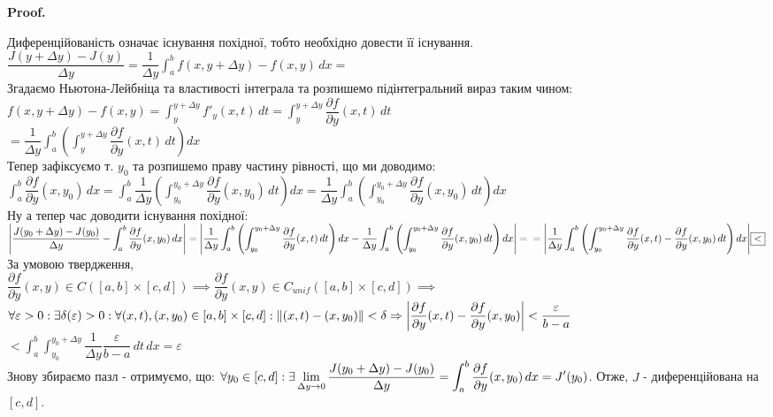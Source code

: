 \documentclass[a4paper, 10pt]{article}
\makeatletter
\def\departial#1#2{\dfrac{\partial {#1}}{\partial {#2}}}
\def\huge{\displaystyle}
\def\qed{$\blacksquare$}
\theoremstyle{theoremdd}
\theoremstyle{theoremdd}
\theoremstyle{theoremdd}
\theoremstyle{theoremdd}
\theoremstyle{theoremdd}
\theoremstyle{theoremdd}
\theoremstyle{theoremdd}
\theoremstyle{theoremdd}
\renewenvironment{proof}[1][Proof.\\]{\par
\pushQED{\hfill \qed}%
\normalfont \topsep6\p@\@plus6\p@\relax
\trivlist
\item\relax
{\bfseries
#1\@addpunct{.}}\hspace\labelsep\ignorespaces
}{%
\popQED\endtrivlist\@endpefalse
}
\newcommand\Norm[1]{\lVert#1\rVert}
\makeatother
\begin{document}
\begin{proof}
Диференційованість означає існування похідної, тобто необхідно довести її існування.\\
$\dfrac{J(y+\Delta y) - J(y)}{\Delta y} = \dfrac{1}{\Delta y} \huge \int_a^b f(x,y+\Delta y) - f(x,y)\,dx \boxed{=}$\\
Згадаємо Ньютона-Лейбніца та властивості інтеграла та розпишемо підінтегральний вираз таким чином:\\
$f(x,y+\Delta y) - f(x,y) = \huge\int_y^{y+\Delta y} f'_y(x,t)\,dt = \int_y^{y+\Delta y} \departial{f}{y}(x,t)\,dt$\\
$\boxed{=} \huge \dfrac{1}{\Delta y} \int_a^b \left( \int_y^{y+\Delta y} \departial{f}{y}(x,t)\,dt \right)dx$\\
Тепер зафіксуємо т. $y_0$ та розпишемо праву частину рівності, що ми доводимо:\\
$\huge \int_a^b \departial{f}{y}(x,y_0)\,dx = \int_a^b \dfrac{1}{\Delta y} \left( \int_{y_0}^{y_0+\Delta y} \departial{f}{y}(x,y_0) \,dt \right)dx = \dfrac{1}{\Delta y} \int_a^b \left( \int_{y_0}^{y_0+\Delta y} \departial{f}{y}(x,y_0) \,dt \right)dx$\\
Ну а тепер час доводити існування похідної:\\
$\huge \abs{\dfrac{J(y_0+\Delta y) - J(y_0)}{\Delta y} - \huge\int_a^b \departial{f}{y}(x,y_0)\,dx}
= \abs{\dfrac{1}{\Delta y} \int_a^b \left( \int_{y_0}^{y_0+\Delta y} \departial{f}{y}(x,t)\,dt \right)dx - \dfrac{1}{\Delta y} \int_a^b \left( \int_{y_0}^{y_0+\Delta y} \departial{f}{y}(x,y_0) \,dt \right)dx} = \\
= \abs{\dfrac{1}{\Delta y} \int_a^b \left( \int_{y_0}^{y_0 + \Delta y} \departial{f}{y}(x,t) - \departial{f}{y}(x,y_0) \,dt \right)dx} \boxed{<}$\\
За умовою твердження, \\ $\departial{f}{y}(x,y) \in C([a,b] \times [c,d]) \implies \departial{f}{y}(x,y) \in C_{unif}([a,b] \times [c,d]) \implies$\\
$\forall \varepsilon > 0: \exists \delta(\varepsilon) > 0: \forall (x,t),(x,y_0) \in [a,b]\times [c,d]: \Norm{(x,t)-(x,y_0)} < \delta \Rightarrow \abs{\departial{f}{y}(x,t) - \departial{f}{y}(x,y_0)} < \dfrac{\varepsilon}{b-a}$\\
$\boxed{<} \huge\int_a^b \int_{y_0}^{y_0+\Delta y} \dfrac{1}{\Delta y} \dfrac{\varepsilon}{b-a} \,dt \,dx = \varepsilon$\\
Знову збираємо пазл - отримуємо, що: $\forall y_0 \in [c,d]: \\ \exists \huge \lim_{\Delta y \to 0} \dfrac{J(y_0+\Delta y)-J(y_0)}{\Delta y} = \int_a^b \departial{f}{y}(x,y_0)\,dx = J'(y_0)$.
Отже, $J$ - диференційована на $[c,d]$.
\end{proof}
\end{document}
